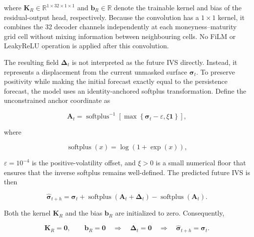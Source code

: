 where
$\mathbf{K}_{R}\in\mathbb{R}^{1\times32\times1\times1}$ and
$\mathbf{b}_{R}\in\mathbb{R}$ denote the trainable kernel and bias of the
residual-output head, respectively. Because the convolution has a
$1\times1$ kernel, it combines the 32 decoder channels independently at each
moneyness--maturity grid cell without mixing information between neighbouring
cells. No FiLM or LeakyReLU operation is applied after this convolution.

The resulting field $\boldsymbol{\Delta}_t$ is not interpreted as the future
IVS directly. Instead, it represents a displacement from the current
unmasked surface $\boldsymbol{\sigma}_t$. To preserve positivity while making
the initial forecast exactly equal to the persistence forecast, the model uses
an identity-anchored softplus transformation. Define the unconstrained anchor
coordinate as

\begin{equation}\label{eq:ch3:residual_anchor}
\mathbf{A}_t
=
\operatorname{softplus}^{-1}
\left[
\max
\left\{
\boldsymbol{\sigma}_t-\varepsilon,
\xi\mathbf{1}
\right\}
\right],
\end{equation}

where

\begin{equation}\label{eq:ch3:softplus_definition}
\operatorname{softplus}(x)
=
\log\left(1+\exp(x)\right),
\end{equation}

$\varepsilon=10^{-4}$ is the positive-volatility offset, and $\xi>0$ is a
small numerical floor that ensures that the inverse softplus remains
well-defined. The predicted future IVS is then

\begin{equation}\label{eq:ch3:identity_residual}
\widehat{\boldsymbol{\sigma}}_{t+h}
=
\boldsymbol{\sigma}_t
+
\operatorname{softplus}
\left(
\mathbf{A}_t+\boldsymbol{\Delta}_t
\right)
-
\operatorname{softplus}
\left(
\mathbf{A}_t
\right).
\end{equation}

Both the kernel $\mathbf{K}_{R}$ and the bias $\mathbf{b}_{R}$ are initialized
to zero. Consequently,

\begin{equation}\label{eq:ch3:residual_identity_initialization}
\mathbf{K}_{R}
=
\mathbf{0},
\qquad
\mathbf{b}_{R}
=
\mathbf{0}
\quad\Longrightarrow\quad
\boldsymbol{\Delta}_t
=
\mathbf{0}
\quad\Longrightarrow\quad
\widehat{\boldsymbol{\sigma}}_{t+h}
=
\boldsymbol{\sigma}_t.
\end{equation}

